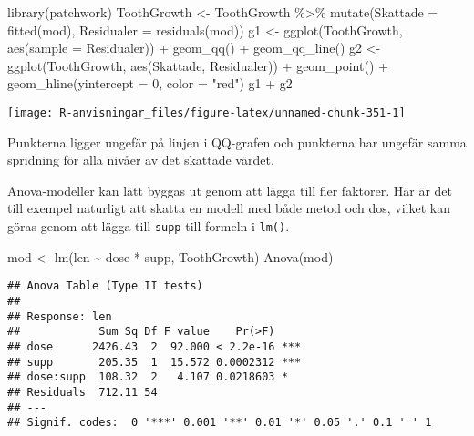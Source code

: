 \documentclass[
]{book}
\newenvironment{Shaded}{\begin{snugshade}}{\end{snugshade}}
\newcommand{\AttributeTok}[1]{\textcolor[rgb]{0.77,0.63,0.00}{#1}}
\newcommand{\DecValTok}[1]{\textcolor[rgb]{0.00,0.00,0.81}{#1}}
\newcommand{\FunctionTok}[1]{\textcolor[rgb]{0.00,0.00,0.00}{#1}}
\newcommand{\NormalTok}[1]{#1}
\newcommand{\OtherTok}[1]{\textcolor[rgb]{0.56,0.35,0.01}{#1}}
\newcommand{\SpecialCharTok}[1]{\textcolor[rgb]{0.00,0.00,0.00}{#1}}
\newcommand{\StringTok}[1]{\textcolor[rgb]{0.31,0.60,0.02}{#1}}
\theoremstyle{definition}
\theoremstyle{definition}
\theoremstyle{definition}
\theoremstyle{definition}
\theoremstyle{remark}
\begin{document}
\begin{Shaded}
\begin{Highlighting}[]
\FunctionTok{library}\NormalTok{(patchwork)}
\NormalTok{ToothGrowth }\OtherTok{\textless{}{-}}\NormalTok{ ToothGrowth }\SpecialCharTok{\%\textgreater{}\%} 
  \FunctionTok{mutate}\NormalTok{(}\AttributeTok{Skattade =} \FunctionTok{fitted}\NormalTok{(mod),}
         \AttributeTok{Residualer =} \FunctionTok{residuals}\NormalTok{(mod))}
\NormalTok{g1 }\OtherTok{\textless{}{-}} \FunctionTok{ggplot}\NormalTok{(ToothGrowth, }\FunctionTok{aes}\NormalTok{(}\AttributeTok{sample =}\NormalTok{ Residualer)) }\SpecialCharTok{+} \FunctionTok{geom\_qq}\NormalTok{() }\SpecialCharTok{+} \FunctionTok{geom\_qq\_line}\NormalTok{()}
\NormalTok{g2 }\OtherTok{\textless{}{-}} \FunctionTok{ggplot}\NormalTok{(ToothGrowth, }\FunctionTok{aes}\NormalTok{(Skattade, Residualer)) }\SpecialCharTok{+}
  \FunctionTok{geom\_point}\NormalTok{() }\SpecialCharTok{+}
  \FunctionTok{geom\_hline}\NormalTok{(}\AttributeTok{yintercept =} \DecValTok{0}\NormalTok{, }\AttributeTok{color =} \StringTok{"red"}\NormalTok{)}
\NormalTok{g1 }\SpecialCharTok{+}\NormalTok{ g2}
\end{Highlighting}
\end{Shaded}

\begin{center}\texttt{[image: R-anvisningar\_files/figure-latex/unnamed-chunk-351-1]} \end{center}

Punkterna ligger ungefär på linjen i QQ-grafen och punkterna har ungefär samma spridning för alla nivåer av det skattade värdet.

Anova-modeller kan lätt byggas ut genom att lägga till fler faktorer. Här är det till exempel naturligt att skatta en modell med både metod och dos, vilket kan göras genom att lägga till \texttt{supp} till formeln i \texttt{lm()}.

\begin{Shaded}
\begin{Highlighting}[]
\NormalTok{mod }\OtherTok{\textless{}{-}} \FunctionTok{lm}\NormalTok{(len }\SpecialCharTok{\textasciitilde{}}\NormalTok{ dose }\SpecialCharTok{*}\NormalTok{ supp, ToothGrowth)}
\FunctionTok{Anova}\NormalTok{(mod)}
\end{Highlighting}
\end{Shaded}

\begin{verbatim}
## Anova Table (Type II tests)
## 
## Response: len
##            Sum Sq Df F value    Pr(>F)    
## dose      2426.43  2  92.000 < 2.2e-16 ***
## supp       205.35  1  15.572 0.0002312 ***
## dose:supp  108.32  2   4.107 0.0218603 *  
## Residuals  712.11 54                      
## ---
## Signif. codes:  0 '***' 0.001 '**' 0.01 '*' 0.05 '.' 0.1 ' ' 1
\end{verbatim}
\end{document}
